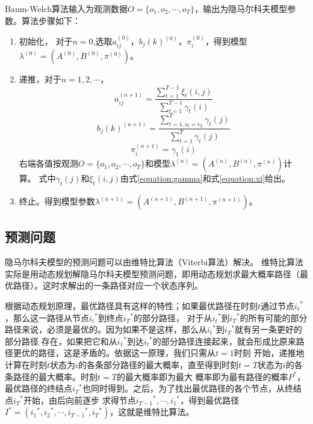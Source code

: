         Baum-Welch算法输入为观测数据$O = \{ {o_1},{o_2}, \cdots ,{o_T}\}$，输出为隐马尔科夫模型参数。算法步骤如下：
        \begin{enumerate}
            \item 初始化，
                对于$n=0$,选取$a_{ij}^{(0)}$，${b_j}{(k)^{(0)}}$，$\pi _i^{(0)}$，得到模型${\lambda ^{(0)}} = \left( {{A^{(0)}},{B^{(0)}},{\pi ^{(0)}}} \right)$。
            \item 递推，对于$n = 1,2, \cdots $，
                    \[a_{ij}^{(n + 1)} = \frac{{\sum\limits_{t = 1}^{T - 1} {{\xi _t}(i,j)} }}{{\sum\limits_{t = 1}^{T - 1} {{\gamma _t}(i)} }}\]
                    \[{b_j}{(k)^{(n + 1)}} = \frac{{\sum\limits_{t = 1,{o_t} = {v_k}}^T {{\gamma _t}(j)} }}{{\sum\limits_{t = 1}^T {{\gamma _t}(j)} }}\]
                    \[\pi _i^{(n + 1)} = {\gamma _1}(i)\]
                    右端各值按观测$O = \{ {o_1},{o_2}, \cdots ,{o_T}\}$和模型${\lambda ^{(n)}} = \left( {{A^{(n)}},{B^{(n)}},{\pi ^{(n)}}} \right)$计算。
                    式中${{\gamma _t}(j)}$和${{\xi _t}(i,j)}$由式\ref{equation:gamma}和式\ref{equation:xi}给出。
            \item 终止。得到模型参数${\lambda ^{(n + 1)}} = \left( {{A^{(n + 1)}},{B^{(n + 1)}},{\pi ^{(n + 1)}}} \right)$。
        \end{enumerate}

    \subsection{预测问题}\label{section:predict}
    隐马尔科夫模型的预测问题可以由维特比算法（Viterbi算法）解决。
    维特比算法实际是用动态规划解隐马尔科夫模型预测问题，即用动态规划求最大概率路径（最优路径）。这时求解出的一条路径对应一个状态序列。

    根据动态规划原理，最优路径具有这样的特性；如果最优路径在时刻$t$通过节点${i_t}^*$，那么这一路径从节点${i_t}^*$到终点${i_T}^*$的部分路径，
    对于从${i_t}^*$到${i_T}^*$的所有可能的部分路径来说，必须是最优的。因为如果不是这样，那么从${i_t}^*$到${i_T}^*$就有另一条更好的部分路径
    存在，如果把它和从${i_1}^*$到达${i_t}^*$的部分路径连接起来，就会形成比原来路径更优的路径，这是矛盾的。依据这一原理，我们只需从$t=1$时刻
    开始，递推地计算在时刻$t$状态为$i$的各条部分路径的最大概率，直至得到时刻$t=T$状态为$i$的各条路径的最大概率。时刻$t=T$的最大概率即为最大
    概率即为最有路径的概率${P^*}$，最优路径的终结点${i_T}^*$也同时得到。之后，为了找出最优路径的各个节点，从终结点${i_T}^*$开始，由后向前逐步
    求得节点${i_{T - 1}}^*, \cdots ,{i_1}^*$，得到最优路径${I^*} = ({i_1}^*,{i_2}^*, \cdots ,{i_{T - 1}}^*,{i_T}^*)$，这就是维特比算法。


